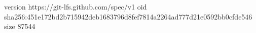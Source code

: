 version https://git-lfs.github.com/spec/v1
oid sha256:451e172bd2b715942deb1683796d8fef7814a2264ad777d21e0592bb0cfde546
size 87544
